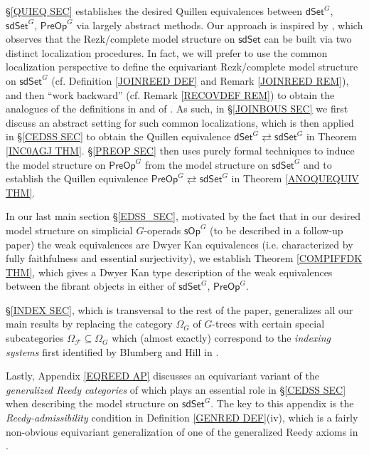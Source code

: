 \documentclass[a4paper,10pt
 ,draft
]{article}%
\begin{document}
\S \ref{QUIEQ SEC} establishes the desired Quillen equivalences between 
$\mathsf{dSet}^G$, $\mathsf{sdSet}^G$, $\mathsf{PreOp}^G$
via largely abstract methods.
Our approach is inspired by 
\cite[Thm. 6.6]{CM13a}, which observes that the Rezk/complete model structure on $\mathsf{sdSet}$ can be built via two distinct localization procedures.
In fact, we will prefer to use the common localization perspective to define the equivariant Rezk/complete model structure on $\mathsf{sdSet}^G$ (cf. Definition \ref{JOINREED DEF} and Remark \ref{JOINREED REM}),
and then ``work backward'' (cf. Remark \ref{RECOVDEF REM}) to obtain the analogues of the definitions in \cite{CM13a} and of \cite[Thm. 6.6]{CM13a}.
%
As such, in \S \ref{JOINBOUS SEC} we first discuss an abstract setting for such common localizations, 
which is then applied in \S \ref{CEDSS SEC} to obtain the Quillen equivalence
$\mathsf{dSet}^G \rightleftarrows \mathsf{sdSet}^G$
in Theorem \ref{INC0AGJ THM}.
\S \ref{PREOP SEC} then uses purely formal techniques to induce the model structure on
$\mathsf{PreOp}^G$ from the model structure on
$\mathsf{sdSet}^G$
and to establish the Quillen equivalence
$\mathsf{PreOp}^G \rightleftarrows \mathsf{sdSet}^G$
in Theorem \ref{ANOQUEQUIV THM}.

In our last main section \S \ref{EDSS_SEC},
motivated by the fact that in our desired model structure on simplicial $G$-operads $\mathsf{sOp}^G$
(to be described in a follow-up paper)
the weak equivalences are Dwyer Kan equivalences
(i.e. characterized by fully faithfulness and essential surjectivity), 
we establish Theorem \ref{COMPIFFDK THM}, which gives a Dwyer Kan type description of the weak equivalences 
between the fibrant objects in either of $\mathsf{sdSet}^G$, $\mathsf{PreOp}^G$.

\S \ref{INDEX SEC}, which is transversal to the rest of the paper, generalizes all our main results by replacing the category $\Omega_G$ of $G$-trees
with certain special subcategories
$\Omega_{\mathcal{F}} \subseteq \Omega_G$
which (almost exactly) correspond to the 
\textit{indexing systems} first identified
by Blumberg and Hill in \cite{BH15}.

Lastly, Appendix \ref{EQREED AP} discusses an equivariant variant of the \textit{generalized Reedy categories}
of \cite{BM11} which plays an essential role in \S \ref{CEDSS SEC}
when describing the model structure on $\mathsf{sdSet}^G$.
The key to this appendix is the \textit{Reedy-admissibility} condition in 
Definition \ref{GENRED DEF}(iv),
which is a fairly non-obvious equivariant generalization of one of the generalized Reedy axioms in \cite{BM11}.
\end{document}

